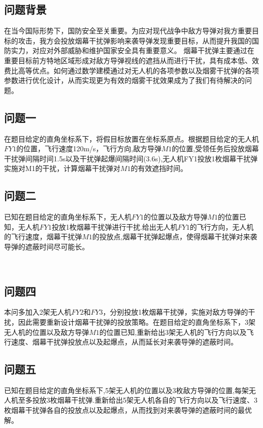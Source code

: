 \documentclass[../main.tex]{subfiles}
\begin{document}
\subsection{问题背景}
\par 在当今国际形势下，国防安全至关重要。为应对现代战争中敌方导弹对我方重要目标的攻击，我方会投放烟幕干扰弹影响来袭导弹发现重要目标，从而提升我国的国防实力，对应对外部威胁和维护国家安全具有重要意义。 烟幕干扰弹主要通过在重要目标前方特地区域形成对敌方导弹视线的遮挡从而进行干扰，具有成本低、效费比高等优点。如何通过数学建模通过对无人机的各项参数以及烟雾干扰弹的各项参数进行优化设计，从而实现更为有效的烟雾干扰效果成为了我们有待解决的问题。



\subsection{问题一}
\par 在题目给定的直角坐标系下，将假目标放置在坐标系原点。根据题目给定的无人机$FY1$的位置，飞行速度120m/s，飞行方向,敌方导弹$M1$的位置,受领任务后投放烟幕干扰弹间隔时间1.5s以及干扰弹起爆间隔时间(3.6s),无人机FY1投放1枚烟幕干扰弹实施对M1的干扰，计算烟幕干扰弹对$M1$的有效遮挡时间。



\subsection{问题二}
\par 已知在题目给定的直角坐标系下，无人机$FY1$的位置以及敌方导弹$M1$的位置已知，无人机$FY1$投放1枚烟幕干扰弹进行干扰.给出无人机$FY1$的飞行方向，无人机的飞行速度，烟幕干扰弹$M1$的投放点,烟幕干扰弹起爆点，使得烟幕干扰弹对来袭导弹的遮蔽时间尽可能长。



\
\subsection{问题四}

\par 本问多加入2架无人机$FY2$和$FY3$，分别投放1枚烟幕干扰弹，实施对敌方导弹的干扰，因此需要重新设计烟幕干扰弹的投放策略。在题目给定的直角坐标系下，3架无人机的位置以及敌方导弹$M1$的位置已知,重新给出3架无人机的飞行方向以及飞行速度、烟幕干扰弹投放点以及起爆点，从而延长对来袭导弹的遮蔽时间。



\subsection{问题五}
\par 已知在题目给定的直角坐标系下,5架无人机的位置以及3枚敌方导弹的位置,每架无人机至多投放3枚烟幕干扰弹.重新给出5架无人机各自的飞行方向以及飞行速度、3枚烟幕干扰弹各自的投放点以及起爆点，从而找到对来袭导弹的遮蔽时间的最优解。
\end{document}
